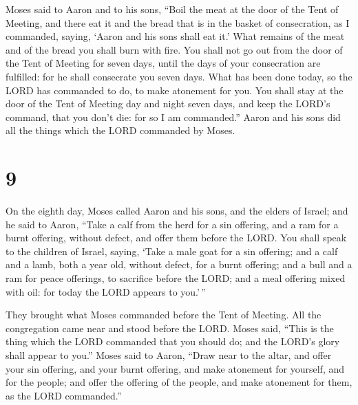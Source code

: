  Moses said to Aaron and to his sons, ``Boil the meat at
the door of the Tent of Meeting, and there eat it and the bread that is
in the basket of consecration, as I commanded, saying, `Aaron and his
sons shall eat it.'  What remains of the meat and of the
bread you shall burn with fire.  You shall not go out from
the door of the Tent of Meeting for seven days, until the days of your
consecration are fulfilled: for he shall consecrate you seven days.
 What has been done today, so the LORD has commanded to do,
to make atonement for you.  You shall stay at the door of
the Tent of Meeting day and night seven days, and keep the LORD's
command, that you don't die: for so I am commanded.'' 
Aaron and his sons did all the things which the LORD commanded by Moses.

\hypertarget{section-8}{%
\section{9}\label{section-8}}

 On the eighth day, Moses called Aaron and his sons, and the
elders of Israel;  and he said to Aaron, ``Take a calf from
the herd for a sin offering, and a ram for a burnt offering, without
defect, and offer them before the LORD.  You shall speak to
the children of Israel, saying, `Take a male goat for a sin offering;
and a calf and a lamb, both a year old, without defect, for a burnt
offering;  and a bull and a ram for peace offerings, to
sacrifice before the LORD; and a meal offering mixed with oil: for today
the LORD appears to you.'\,''

 They brought what Moses commanded before the Tent of
Meeting. All the congregation came near and stood before the LORD.
 Moses said, ``This is the thing which the LORD commanded
that you should do; and the LORD's glory shall appear to you.''
 Moses said to Aaron, ``Draw near to the altar, and offer
your sin offering, and your burnt offering, and make atonement for
yourself, and for the people; and offer the offering of the people, and
make atonement for them, as the LORD commanded.''

